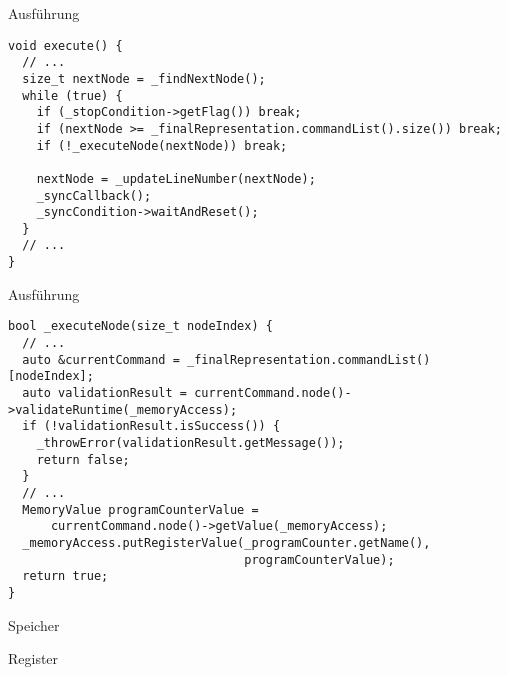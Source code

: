 \begin{frame}[fragile]{Ausführung}
\begin{lstlisting}[style=C++]
void execute() {
  // ...
  size_t nextNode = _findNextNode();
  while (true) {
    if (_stopCondition->getFlag()) break;
    if (nextNode >= _finalRepresentation.commandList().size()) break;
    if (!_executeNode(nextNode)) break;

    nextNode = _updateLineNumber(nextNode);
    _syncCallback();
    _syncCondition->waitAndReset();
  }
  // ...
}
\end{lstlisting}
\end{frame}

\begin{frame}[fragile]{Ausführung}
\begin{lstlisting}[style=C++]
bool _executeNode(size_t nodeIndex) {
  // ...
  auto &currentCommand = _finalRepresentation.commandList()[nodeIndex];
  auto validationResult = currentCommand.node()->validateRuntime(_memoryAccess);
  if (!validationResult.isSuccess()) {
    _throwError(validationResult.getMessage());
    return false;
  }
  // ...
  MemoryValue programCounterValue =
      currentCommand.node()->getValue(_memoryAccess);
  _memoryAccess.putRegisterValue(_programCounter.getName(),
                                 programCounterValue);
  return true;
}
\end{lstlisting}
\end{frame}

\begin{slide}{Speicher}

\end{slide}

\begin{slide}{Register}

\end{slide}
